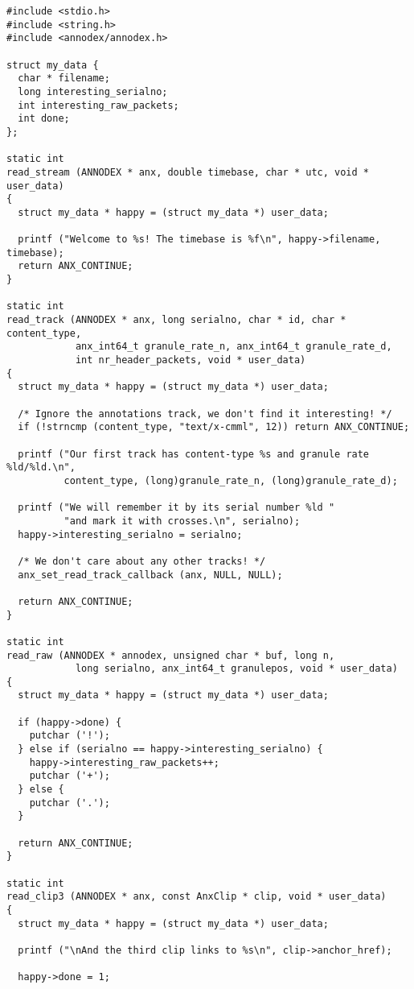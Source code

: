 \footnotesize\begin{verbatim}
#include <stdio.h>
#include <string.h>
#include <annodex/annodex.h>

struct my_data {
  char * filename;
  long interesting_serialno;
  int interesting_raw_packets;
  int done;
};

static int
read_stream (ANNODEX * anx, double timebase, char * utc, void * user_data)
{
  struct my_data * happy = (struct my_data *) user_data;

  printf ("Welcome to %s! The timebase is %f\n", happy->filename, timebase);
  return ANX_CONTINUE;
}

static int
read_track (ANNODEX * anx, long serialno, char * id, char * content_type,
            anx_int64_t granule_rate_n, anx_int64_t granule_rate_d,
            int nr_header_packets, void * user_data)
{
  struct my_data * happy = (struct my_data *) user_data;

  /* Ignore the annotations track, we don't find it interesting! */
  if (!strncmp (content_type, "text/x-cmml", 12)) return ANX_CONTINUE;

  printf ("Our first track has content-type %s and granule rate %ld/%ld.\n",
          content_type, (long)granule_rate_n, (long)granule_rate_d);

  printf ("We will remember it by its serial number %ld "
          "and mark it with crosses.\n", serialno);
  happy->interesting_serialno = serialno;

  /* We don't care about any other tracks! */
  anx_set_read_track_callback (anx, NULL, NULL);

  return ANX_CONTINUE;
}

static int
read_raw (ANNODEX * annodex, unsigned char * buf, long n,
            long serialno, anx_int64_t granulepos, void * user_data)
{
  struct my_data * happy = (struct my_data *) user_data;

  if (happy->done) {
    putchar ('!');
  } else if (serialno == happy->interesting_serialno) {
    happy->interesting_raw_packets++;
    putchar ('+');
  } else {
    putchar ('.');
  }

  return ANX_CONTINUE;
}

static int
read_clip3 (ANNODEX * anx, const AnxClip * clip, void * user_data)
{
  struct my_data * happy = (struct my_data *) user_data;

  printf ("\nAnd the third clip links to %s\n", clip->anchor_href);

  happy->done = 1;


\end{verbatim}
